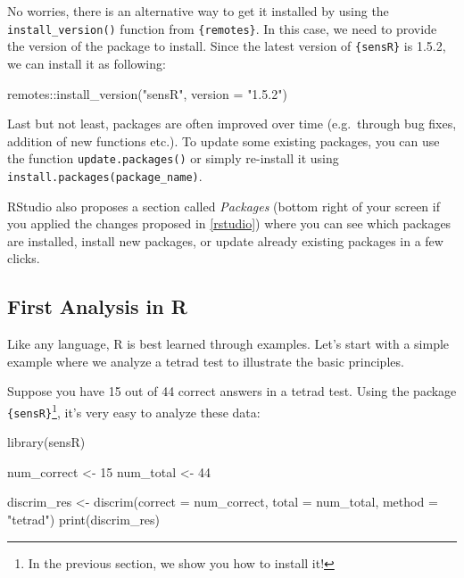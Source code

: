 \documentclass[
]{krantz}
\makeatletter
\newenvironment{Shaded}{\begin{snugshade}}{\end{snugshade}}
\newcommand{\AttributeTok}[1]{\textcolor[rgb]{0.61,0.61,0.61}{#1}}
\newcommand{\DecValTok}[1]{\textcolor[rgb]{0.06,0.06,0.06}{#1}}
\newcommand{\FunctionTok}[1]{\textcolor[rgb]{0,0,0}{#1}}
\newcommand{\NormalTok}[1]{#1}
\newcommand{\OtherTok}[1]{\textcolor[rgb]{0.37,0.37,0.37}{#1}}
\newcommand{\SpecialCharTok}[1]{\textcolor[rgb]{0,0,0}{#1}}
\newcommand{\StringTok}[1]{\textcolor[rgb]{0.5,0.5,0.5}{#1}}
\renewenvironment{quote}{\begin{VF}}{\end{VF}}
\newenvironment{kframe}{%
\medskip{}
\setlength{\fboxsep}{.8em}
 \def\at@end@of@kframe{}%
 \ifinner\ifhmode%
  \def\at@end@of@kframe{\end{minipage}}%
  \begin{minipage}{\columnwidth}%
 \fi\fi%
 \def\FrameCommand##1{\hskip\@totalleftmargin \hskip-\fboxsep
 \colorbox{shadecolor}{##1}\hskip-\fboxsep
     \hskip-\linewidth \hskip-\@totalleftmargin \hskip\columnwidth}%
 \MakeFramed {\advance\hsize-\width
   \@totalleftmargin\z@ \linewidth\hsize
   \@setminipage}}%
 {\par\unskip\endMakeFramed%
 \at@end@of@kframe}
\renewenvironment{Shaded}{\begin{kframe}}{\end{kframe}}
\makeatother
\begin{document}
No worries, there is an alternative way to get it installed by using the \texttt{install\_version()} function from \texttt{\{remotes\}}. In this case, we need to provide the version of the package to install. Since the latest version of \texttt{\{sensR\}} is 1.5.2, we can install it as following:

\begin{Shaded}
\begin{Highlighting}[]
\NormalTok{remotes}\SpecialCharTok{::}\FunctionTok{install\_version}\NormalTok{(}\StringTok{"sensR"}\NormalTok{, }\AttributeTok{version =} \StringTok{"1.5.2"}\NormalTok{)}
\end{Highlighting}
\end{Shaded}

Last but not least, packages are often improved over time (e.g.~through bug fixes, addition of new functions etc.). To update some existing packages, you can use the function \texttt{update.packages()} or simply re-install it using \texttt{install.packages(package\_name)}.

\begin{quote}
RStudio also proposes a section called \emph{Packages} (bottom right of your screen if you applied the changes proposed in \ref{rstudio}) where you can see which packages are installed, install new packages, or update already existing packages in a few clicks.
\end{quote}

\hypertarget{first-analysis-in-r}{%
\subsection{First Analysis in R}\label{first-analysis-in-r}}

Like any language, R is best learned through examples. Let's start with a simple example where we analyze a tetrad test to illustrate the basic principles.

Suppose you have 15 out of 44 correct answers in a tetrad test. Using the package \texttt{\{sensR\}}\footnote{In the previous section, we show you how to install it!}, it's very easy to analyze these data:

\begin{Shaded}
\begin{Highlighting}[]
\FunctionTok{library}\NormalTok{(sensR)}

\NormalTok{num\_correct }\OtherTok{\textless{}{-}} \DecValTok{15}  
\NormalTok{num\_total }\OtherTok{\textless{}{-}} \DecValTok{44}  
  
\NormalTok{discrim\_res }\OtherTok{\textless{}{-}} \FunctionTok{discrim}\NormalTok{(}\AttributeTok{correct =}\NormalTok{ num\_correct, }\AttributeTok{total =}\NormalTok{ num\_total, }
                       \AttributeTok{method =} \StringTok{"tetrad"}\NormalTok{)}
\FunctionTok{print}\NormalTok{(discrim\_res)  }
\end{Highlighting}
\end{Shaded}
\end{document}
